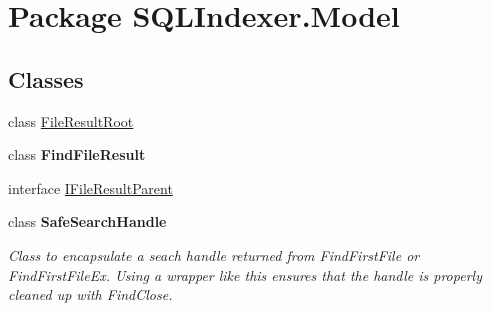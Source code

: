 \hypertarget{namespace_s_q_l_indexer_1_1_model}{\section{Package S\-Q\-L\-Indexer.\-Model}
\label{namespace_s_q_l_indexer_1_1_model}
}
\subsection*{Classes}
\begin{DoxyCompactItemize}
\item 
class \hyperlink{class_s_q_l_indexer_1_1_model_1_1_file_result_root}{File\-Result\-Root}
\item 
class {\bfseries Find\-File\-Result}
\item 
interface \hyperlink{interface_s_q_l_indexer_1_1_model_1_1_i_file_result_parent}{I\-File\-Result\-Parent}
\item 
class {\bfseries Safe\-Search\-Handle}
\begin{DoxyCompactList}\small\item\em Class to encapsulate a seach handle returned from Find\-First\-File or Find\-First\-File\-Ex. Using a wrapper like this ensures that the handle is properly cleaned up with Find\-Close. \end{DoxyCompactList}\end{DoxyCompactItemize}
